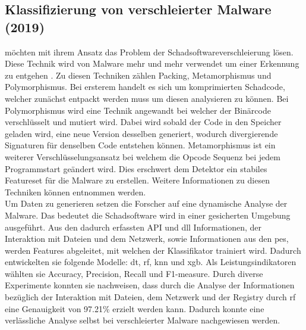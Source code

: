 \documentclass[
    12pt, %
    DIV10,
    ngerman, %
    a4paper, %
    oneside, %
    titlepage, %
    parskip=half, %
    headings=normal, %
    listof=totoc, %
    bibliography=totoc, %
    index=totoc, %
    captions=tableheading, %
    final %
]{scrreprt}
\begin{document}
\subsection{Klassifizierung von verschleierter Malware (2019)}
\textcite{Han2019} möchten mit ihrem Ansatz das Problem der Schadsoftwareverschleierung lösen. Diese Technik wird von Malware mehr und mehr verwendet um einer Erkennung zu entgehen \parencite{li2016facial}. Zu diesen Techniken zählen  Packing, Metamorphismus und Polymorphismus. Bei ersterem handelt es sich um komprimierten Schadcode, welcher zunächst entpackt werden muss um diesen analysieren zu können. Bei Polymorphismus wird eine Technik angewandt bei welcher der Binärcode verschlüsselt und mutiert wird. Dabei wird sobald der Code in den Speicher geladen wird, eine neue Version desselben generiert, wodurch divergierende Signaturen für denselben Code entstehen können. Metamorphismus ist ein weiterer Verschlüsselungsansatz bei welchem die Opcode Sequenz bei jedem Programmstart geändert wird. Dies erschwert dem Detektor ein stabiles Featureset für die Malware zu erstellen. Weitere Informationen zu diesen Techniken können \textcite{he2017model} entnommen werden.\\
Um Daten zu generieren setzen die Forscher auf eine dynamische Analyse der Malware. Das bedeutet die Schadsoftware wird in einer gesicherten Umgebung ausgeführt. Aus den dadurch erfassten API und \ac{dll} Informationen, der Interaktion mit Dateien und dem Netzwerk, sowie Informationen aus den \ac{pes}, werden Features abgeleitet, mit welchen der Klassifikator trainiert wird. Dadurch entwickelten sie folgende Modelle: \ac{dt}, \ac{rf}, \ac{knn} und \ac{xgb}. Als Leistungsindikatoren wählten sie Accuracy, Precision, Recall und F1-measure. Durch diverse Experimente konnten sie nachweisen, dass durch die Analyse der Informationen bezüglich der Interaktion mit Dateien, dem Netzwerk und der Registry durch \ac{rf} eine Genauigkeit von 97.21\% erzielt werden kann. Dadurch konnte eine verlässliche Analyse selbst bei verschleierter Malware nachgewiesen werden. 

%
\end{document}
